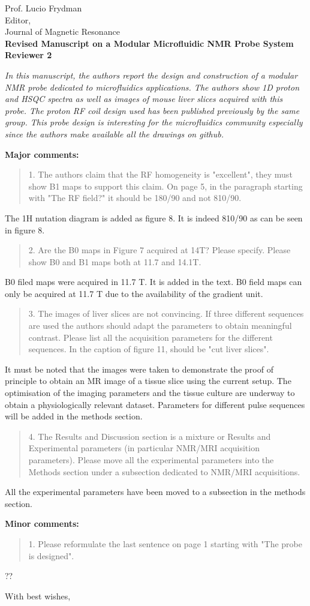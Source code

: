 \documentclass{mu-soton-letter}
\newenvironment{reviewer} {\begin{quote}\color{black!50}} {\end{quote}}
\begin{document}
\begin{letter}{Prof. Lucio Frydman\\
  Editor,\\
  Journal of Magnetic Resonance\\[2cm]
  \textbf{Revised Manuscript on a Modular Microfluidic NMR Probe System}}
\textbf{Reviewer 2}

\textcolor{black!50}{
\emph{In this manuscript, the authors report the design and construction of a modular NMR probe dedicated to microfluidics applications.  The authors show 1D proton and HSQC spectra as well as images of mouse liver slices acquired with this probe. The proton RF coil design used has been published previously by the same group. This probe design is interesting for the microfluidics community especially since the authors make available all the drawings on github.}}

\textcolor{black!50}{ \textbf{Major comments:}}

\begin{reviewer}
1.      The authors claim that the RF homogeneity is "excellent", they must show B1 maps to support this claim.  On page 5, in the paragraph starting with "The RF field?" it should be 180/90 and not 810/90.
\end{reviewer}
The 1H nutation diagram is added as figure 8. It is indeed 810/90 as can be seen in figure 8.
\begin{reviewer}
2.      Are the B0 maps in Figure 7 acquired at 14T?  Please specify. Please show B0 and B1 maps both at 11.7 and 14.1T.
\end{reviewer}
B0 filed maps were acquired in 11.7 T. It is added in the text. B0 field maps can only be acquired at 11.7 T due to the availability of the gradient unit.
\begin{reviewer}
3.      The images of liver slices are not convincing.  If three different sequences are used the authors should adapt the parameters to obtain meaningful contrast. Please list all the acquisition parameters for the different sequences. In the caption of figure 11, should be "cut liver slices".
\end{reviewer}
It must be noted that the images were taken to demonstrate the proof of principle to obtain an MR image of a tissue slice using the current setup. The optimisation of the imaging parameters and the tissue culture are underway to obtain a physiologically relevant dataset. Parameters for different pulse sequences will be added in the methods section.
\begin{reviewer}
4.      The Results and Discussion section is a mixture or Results and Experimental parameters (in particular NMR/MRI acquisition parameters). Please move all the experimental parameters into the Methods section under a subsection dedicated to NMR/MRI acquisitions.
\end{reviewer}
All the experimental parameters have been moved to a subsection in the methods section.

\textcolor{black!50}{ \textbf{Minor comments:}}
\begin{reviewer}
1.      Please reformulate the last sentence on page 1 starting with "The probe is designed".
\end{reviewer}
??



\closing{With best wishes,}

\end{letter}
\end{document}
